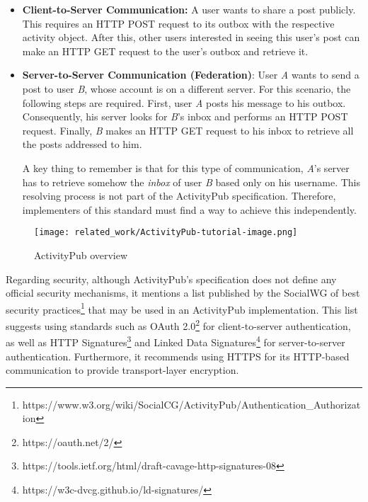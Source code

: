 \begin{itemize}
  \item \textbf{Client-to-Server Communication:} A user wants to share a post publicly. This requires an HTTP POST request to its outbox with the respective activity object. After this, other users interested in seeing this user's post can make an HTTP GET request to the user's outbox and retrieve it.
  \item \textbf{Server-to-Server Communication (Federation)}: User \emph{A} wants to send a post to user \emph{B}, whose account is on a different server. For this scenario, the following steps are required. First, user \emph{A} posts his message to his outbox. Consequently, his server looks for \emph{B}'s inbox and performs an HTTP POST request. Finally, \emph{B} makes an HTTP GET request to his inbox to retrieve all the posts addressed to him.
  
  A key thing to remember is that for this type of communication, \emph{A}'s server has to retrieve somehow the \emph{inbox} of user \emph{B} based only on his username. This resolving process is not part of the ActivityPub specification. Therefore, implementers of this standard must find a way to achieve this independently. 
\end{itemize}
 

\begin{figure}[H]
  \centering
  \texttt{[image: related\_work/ActivityPub-tutorial-image.png]}
  \caption{ActivityPub overview \cite{lemmer-webber_tallon_guy_prodromou_2018}}
  \label{fig:ap_flow}
\end{figure}
\pagebreak

Regarding security, although ActivityPub's specification does not define any official security mechanisms, it mentions a list published by the SocialWG of best security practices\footnote{https://www.w3.org/wiki/SocialCG/ActivityPub/Authentication\_Authorization} that may be used in an ActivityPub implementation. This list suggests using standards such as OAuth 2.0\footnote{https://oauth.net/2/} for client-to-server authentication, as well as HTTP Signatures\footnote{https://tools.ietf.org/html/draft-cavage-http-signatures-08} and Linked Data Signatures\footnote{https://w3c-dvcg.github.io/ld-signatures/} for server-to-server authentication. Furthermore, it recommends using HTTPS for its HTTP-based communication to provide transport-layer encryption.



